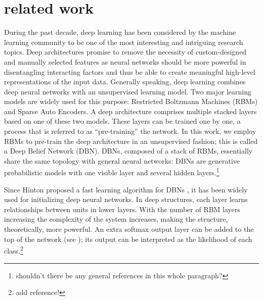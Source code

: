\documentclass{article}
\begin{document}
\section{related work}
During the past decade, deep learning has been considered by the machine learning community to be one of the most interesting and intriguing research topics. Deep architectures promise to remove the necessity of custom-designed and manually selected features as neural networks should be more powerful in disentangling interacting factors and thus be able to create meaningful high-level representations of the input data. Generally speaking, deep learning combines deep neural networks with an unsupervised learning model. Two major learning models are widely used for this purpose: Restricted Boltzmann Machines (RBMs) and Sparse Auto Encoders. A deep architecture comprises multiple stacked layers based on one of these two models. These layers can be trained one by one, a process that is referred to as ``pre-training'' the network. In this work, we employ RBMs to pre-train the deep architecture in an unsupervised fashion; this is called a Deep Belief Network (DBN). DBNs, composed of a stack of RBMs, essentially share the same topology with general neural networks: DBNs are generative probabilistic models with one visible layer and several hidden layers.\footnote{shouldn't there be any general references in this whole paragraph?}
 
Since Hinton proposed a fast learning algorithm for DBNs \cite{hinton2006fast}, it has been widely used for initializing deep neural networks. In deep structures, each layer learns relationships between units in lower layers. With the number of RBM layers increasing the complexity of the system increases, making the structure, theoretically, more powerful. An extra softmax output layer can be added to the top of the network (see ); its output can be interpreted as the likelihood of each class.\footnote{add reference!}
\end{document}
